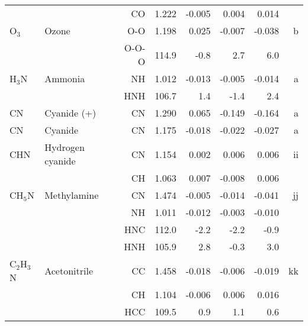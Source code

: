 \begin{table}
\begin{center}
\begin{tabular}{llrrrrrr}
        &                                    &CO            &     1.222   &    -0.005 &     0.004 &     0.014 &       \\
 O$_3$          & Ozone                              &O-O           &     1.198   &     0.025 &    -0.007 &    -0.038 &     b \\
        &                                    &O-O-O       &     114.9   &      -0.8 &       2.7 &       6.0   &       \\
 H$_3$N         & Ammonia                            &NH            &     1.012   &    -0.013 &    -0.005 &    -0.014 &     a \\
        &                                    &HNH         &     106.7   &       1.4 &      -1.4 &       2.4   &       \\
 CN          &           Cyanide (+)              &CN            &     1.290   &     0.065 &    -0.149 &    -0.164 &     a \\
 CN          & Cyanide                            &CN            &     1.175   &    -0.018 &    -0.022 &    -0.027 &     a \\
 CHN         & Hydrogen cyanide                   &CN            &     1.154   &     0.002 &     0.006 &     0.006 &    ii \\
        &                                    &CH            &     1.063   &     0.007 &    -0.008 &     0.006 &       \\
 CH$_5$N        & Methylamine                        &CN            &     1.474   &    -0.005 &    -0.014 &    -0.041 &    jj \\
        &                                    &NH            &     1.011   &    -0.012 &    -0.003 &    -0.010 &       \\
        &                                    &HNC         &     112.0   &      -2.2 &      -2.2 &      -0.9   &       \\
        &                                    &HNH         &     105.9   &       2.8 &      -0.3 &       3.0   &       \\
 C$_2$H$_3$N       & Acetonitrile                       &CC            &     1.458   &    -0.018 &    -0.006 &    -0.019 &    kk \\
        &                                    &CH            &     1.104   &    -0.006 &     0.006 &     0.016 &       \\
        &                                    &HCC         &     109.5   &       0.9 &       1.1 &       0.6   &       \\

\end{tabular}
\end{center}
\end{table}
